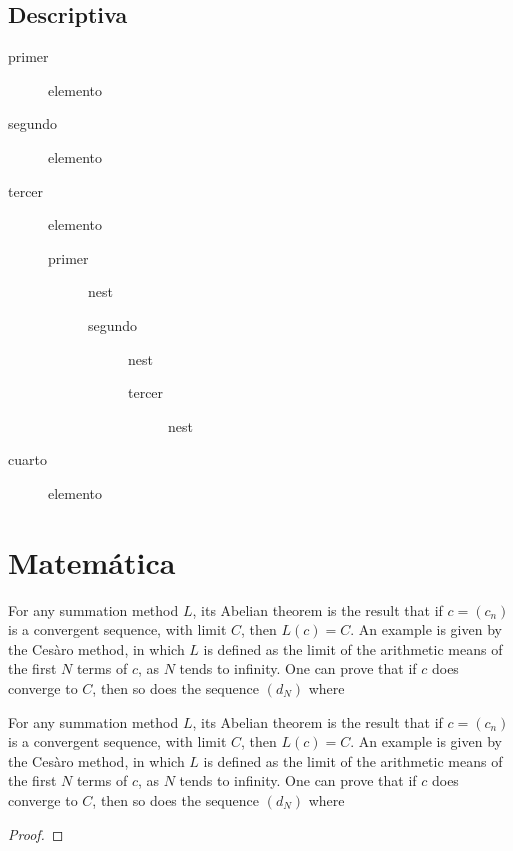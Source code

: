 \documentclass[theorems,spanish]{Marianita}
\begin{document}
\begin{minipage}{0.5\textwidth}
{\color{third}\subsection{Descriptiva}}
\begin{description}
    \item[primer] elemento
    \item[segundo] elemento
    \item[tercer] elemento
    \begin{description}
        \item[primer] nest
        \begin{description}
            \item[segundo] nest
            \begin{description}
                \item[tercer] nest
            \end{description}
        \end{description}
    \end{description}
    \item[cuarto] elemento
\end{description}
\end{minipage}

{\color{second}\section{Matemática}}
\kant[4]
\begin{theorem}[Subtítulo]
For any summation method $L$, its Abelian theorem is the result that if $c=(c_n)$ is a convergent sequence, with limit $C$, then $L(c)=C$. An example is given by the Cesàro method, in which $L$ is defined as the limit of the arithmetic means of the first $N$ terms of $c$, as $N$ tends to infinity. One can prove that if $c$ does converge to $C$, then so does the sequence $(d_N)$ where
\end{theorem}
\kant[5]
\begin{theorem*}
For any summation method $L$, its Abelian theorem is the result that if $c=(c_n)$ is a convergent sequence, with limit $C$, then $L(c)=C$. An example is given by the Cesàro method, in which $L$ is defined as the limit of the arithmetic means of the first $N$ terms of $c$, as $N$ tends to infinity. One can prove that if $c$ does converge to $C$, then so does the sequence $(d_N)$ where
\end{theorem*}
\kant[6]
\begin{proof}
\kant[7]
\end{proof}
\end{document}
